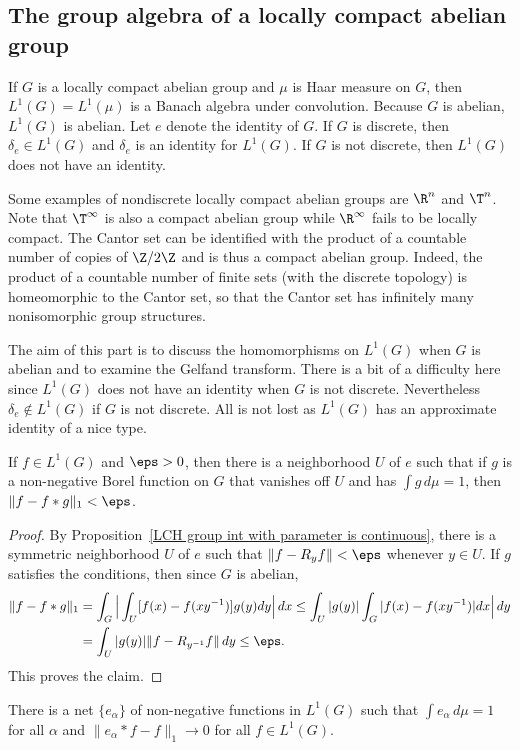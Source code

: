 \subsection{The group algebra of a locally compact abelian group}
If $G$ is a locally compact abelian group and $\mu$ is Haar measure on $G$, then $L^1(G)=L^1(\mu)$ is a Banach algebra under convolution. Because $G$ is abelian, $L^1(G)$ is abelian. Let $e$ denote the identity of $G$. If $G$ is discrete, then $\delta_e\in L^1(G)$ and $\delta_e$ is an identity for $L^1(G)$. If $G$ is not discrete, then $L^1(G)$ does not have an identity.\par
Some examples of nondiscrete locally compact abelian groups are $\R^n$ and $\T^n$. Note that $\T^\infty$ is also a compact abelian group while $\R^\infty$ fails to be locally compact. The Cantor set can be identified with the product of a countable number of copies of $\Z/2\Z$ and is thus a compact abelian group. Indeed, the product of a countable number of finite sets (with the discrete topology) is homeomorphic to the Cantor set, so that the Cantor set has infinitely many nonisomorphic group structures.\par
The aim of this part is to discuss the homomorphisms on $L^1(G)$ when $G$ is abelian and to examine the Gelfand transform. There is a bit of a difficulty here since $L^1(G)$ does not have an identity when $G$ is not discrete. Nevertheless $\delta_e\notin L^1(G)$ if $G$ is not discrete. All is not lost as $L^1(G)$ has an approximate identity of a nice type.
\begin{proposition}\label{LCH group algebra approximate identity nbhd}
If $f\in L^1(G)$ and $\eps>0$, then there is a neighborhood $U$ of $e$ such that if $g$ is a non-negative Borel function on $G$ that vanishes off $U$ and has $\int g\,d\mu=1$, then $\|f-f\ast g\|_1<\eps$.
\end{proposition}
\begin{proof}
By Proposition~\ref{LCH group int with parameter is continuous}, there is a symmetric neighborhood $U$ of $e$ such that $\|f-R_yf\|<\eps$ whenever $y\in U$. If $g$ satisfies the conditions, then since $G$ is abelian,
\begin{align*}
\|f-f\ast g\|_1&=\int_G\Big|\int_U[f(x)-f(xy^{-1})]g(y)dy\Big|\,dx\leq\int_U|g(y)|\int_G|f(x)-f(xy^{-1})|dx\Big|\,dy\\
&=\int_U|g(y)|\|f-R_{y^{-1}}f\|\,dy\leq\eps.
\end{align*}
This proves the claim.
\end{proof}
\begin{corollary}\label{LCH group algebra approximate identity exist}
There is a net $\{e_\alpha\}$ of non-negative functions in $L^1(G)$ such that $\int e_\alpha\,d\mu=1$ for all $\alpha$ and $\|e_\alpha\ast f-f\|_1\to 0$ for all $f\in L^1(G)$.
\end{corollary}
